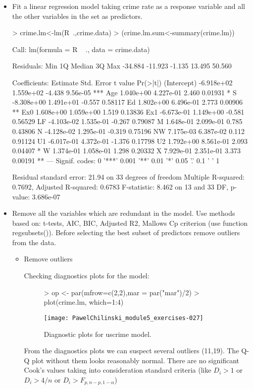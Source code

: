 \documentclass[a4paper]{article}
\begin{document}
\begin{itemize}
\item Fit a linear regression model taking crime rate as a response variable and all the other variables in the
set as predictors.
\begin{Schunk}
\begin{Sinput}
> crime.lm<-lm(R~.,crime.data)
> (crime.lm.sum<-summary(crime.lm))
\end{Sinput}
\begin{Soutput}
Call:
lm(formula = R ~ ., data = crime.data)

Residuals:
    Min      1Q  Median      3Q     Max 
-34.884 -11.923  -1.135  13.495  50.560 

Coefficients:
              Estimate Std. Error t value Pr(>|t|)    
(Intercept) -6.918e+02  1.559e+02  -4.438 9.56e-05 ***
Age          1.040e+00  4.227e-01   2.460  0.01931 *  
S           -8.308e+00  1.491e+01  -0.557  0.58117    
Ed           1.802e+00  6.496e-01   2.773  0.00906 ** 
Ex0          1.608e+00  1.059e+00   1.519  0.13836    
Ex1         -6.673e-01  1.149e+00  -0.581  0.56529    
LF          -4.103e-02  1.535e-01  -0.267  0.79087    
M            1.648e-01  2.099e-01   0.785  0.43806    
N           -4.128e-02  1.295e-01  -0.319  0.75196    
NW           7.175e-03  6.387e-02   0.112  0.91124    
U1          -6.017e-01  4.372e-01  -1.376  0.17798    
U2           1.792e+00  8.561e-01   2.093  0.04407 *  
W            1.374e-01  1.058e-01   1.298  0.20332    
X            7.929e-01  2.351e-01   3.373  0.00191 ** 
---
Signif. codes:  0 '***' 0.001 '**' 0.01 '*' 0.05 '.' 0.1 ' ' 1

Residual standard error: 21.94 on 33 degrees of freedom
Multiple R-squared:  0.7692,	Adjusted R-squared:  0.6783 
F-statistic: 8.462 on 13 and 33 DF,  p-value: 3.686e-07
\end{Soutput}
\end{Schunk}
\item Remove all the variables which are redundant in the model. Use methods
based on: t-tests, AIC, BIC, Adjusted R2, Mallows Cp criterion (use function regsubsets()). 
Before selecting the best subset of predictors remove outliers from the data.
\begin{itemize}
\item Remove outliers

Checking diagnostics plots for the model:
\begin{figure}[H]
\begin{center}
\begin{Schunk}
\begin{Sinput}
> op <- par(mfrow=c(2,2),mar = par("mar")/2)
> plot(crime.lm, which=1:4)
\end{Sinput}
\end{Schunk}
\texttt{[image: PawelChilinski\_module5\_exercises-027]}
\caption{Diagnostic plots for uscrime model.}
\end{center}
\end{figure}
From the diagnostics plots we can suspect several outliers (11,19). The Q-Q plot
without them looks reasonably normal. There are no significant Cook's values
taking into consideration standard criteria (like $D_i>1$ or $D_i>4/n$ or $D_i>F_{p,n-p,1-\alpha}$)


\end{itemize}
\end{itemize}
\end{document}

